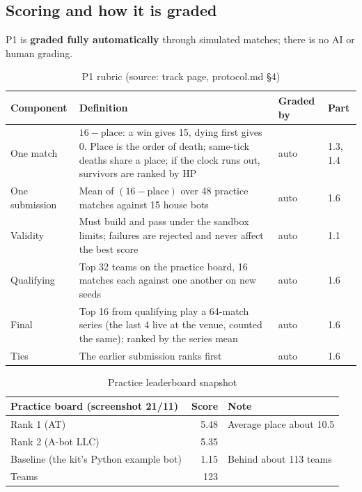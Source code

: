 \documentclass[a4paper,12pt]{article}
\newcommand{\src}[1]{{\footnotesize\textcolor{p7}{(source: #1)}}}
\newcommand{\fn}[1]{\texttt{\detokenize{#1}}}
\begin{document}
\subsection{Scoring and how it is graded}
P1 is \textbf{graded fully automatically} through simulated matches; there is no AI or human grading.

\begin{table}[H]
\centering\small
\begin{tabularx}{\textwidth}{L{3.3cm}YC{1.9cm}C{1.5cm}}
\toprule
\textbf{Component} & \textbf{Definition} & \textbf{Graded by} & \textbf{Part} \\
\midrule
One match & $16 - \text{place}$: a win gives 15, dying first gives 0. Place is the order of death; same-tick deaths share a place; if the clock runs out, survivors are ranked by HP & auto & 1.3, 1.4 \\
One submission & Mean of $(16-\text{place})$ over 48 practice matches against 15 house bots & auto & 1.6 \\
Validity & Must build and pass \fn{check/check.py} under the sandbox limits; failures are rejected and never affect the best score & auto & 1.1 \\
Qualifying & Top 32 teams on the practice board, 16 matches each against one another on new seeds & auto & 1.6 \\
Final & Top 16 from qualifying play a 64-match series (the last 4 live at the venue, counted the same); ranked by the series mean & auto & 1.6 \\
Ties & The earlier submission ranks first & auto & 1.6 \\
\bottomrule
\end{tabularx}
\caption{P1 rubric \src{track page, protocol.md §4}}
\end{table}

\begin{table}[H]
\centering\small
\begin{tabular}{lrl}
\toprule
\textbf{Practice board (screenshot 21/11)} & \textbf{Score} & \textbf{Note} \\
\midrule
Rank 1 (AT) & 5.48 & Average place about 10.5 \\
Rank 2 (A-bot LLC) & 5.35 & \\
Baseline (the kit's Python example bot) & 1.15 & Behind about 113 teams \\
Teams & 123 & \\
\bottomrule
\end{tabular}
\caption{Practice leaderboard snapshot}
\end{table}
\end{document}
